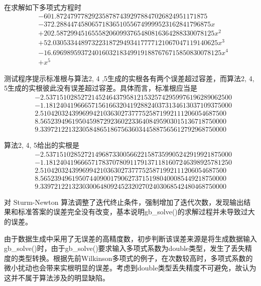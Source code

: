 	\begin{example}[读入误差1]~
		
		在求解如下多项式方程时
		$$
		\begin{aligned}
		& -601.8724797782923587874392978847026824951171875 \\ 
		& - 372.28844745806571836510556749999523162841796875x \\
		& + 202.587299451655582060993765480816364288330078125x^2 \\
		& + 52.03053344897322318729493417777121067047119140625x^3 \\
		& - 16.696989593724016032183499191887676715850830078125x^4 \\
		& + x^5
		\end{aligned}
		$$
		
		测试程序提示标准根与算法2, 4 ,5生成的实根各有两个误差超过容差，而算法2, 4, 5生成的实根彼此没有误差超过容差。具体而言，标准根应当是
		$$
		\begin{aligned}
		& -2.53715102852721452464379581215325742959976196289062500 \\
		& -1.18124041966657156166320419288240373134613037109375000 \\
		& 2.51042032439969942103630273777525871992111206054687500 \\
		& 8.56523949619504598729236022336408495903015136718750000 \\
		& 9.33972122132305848651867563603445887565612792968750000
		\end{aligned}
		$$
		
		算法2, 4, 5给出的实根是
		$$
		\begin{aligned}
		& -2.53715102852721496873300566221587359905242919921875000 \\
		& -1.18124041966657178370780911791371181607246398925781250 \\
		& 2.51042032439969942103630273777525871992111206054687500 \\
		& 8.56523949619507440900179062737151980400085449218750000 \\
		& 9.33972122132303006480924523202702403068542480468750000
		\end{aligned}
		$$
		
	\end{example}

	对 Sturm-Newton 算法调整了迭代终止条件，强制增加了迭代次数，发现输出结果和标准答案的误差完全没有改变，基本说明gb\_solve()的求解过程并未导致过大的误差。 
	
	由于数据生成中采用了无误差的高精度数，初步判断该误差来源是将生成数据输入gb\_solve()时，由于gb\_solve()要求输入多项式系数为double类型，发生了丢失精度的类型转换。根据先前Wilkinson多项式的例子，在次数较高时，多项式系数的微小扰动也会带来实根明显的误差。考虑到double类型丢失精度不可避免，故认为这并不属于算法涉及的明显缺陷。
	
